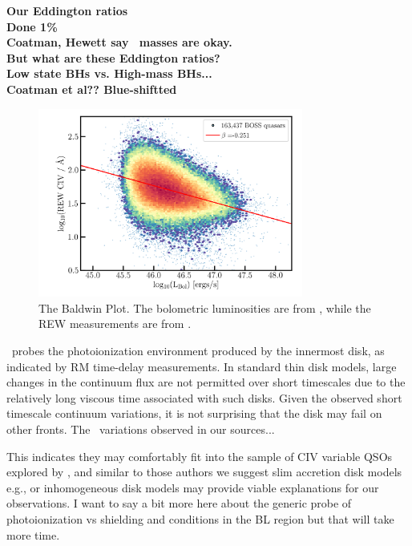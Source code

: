 \documentclass[a4paper,fleqn,usenatbib]{mnras}
\begin{document}
\noindent
{\bf Our Eddington ratios \\
Done 1\% \\
Coatman, Hewett say \civ\ masses are okay.\\
But what are these Eddington ratios? \\
Low state BHs vs. High-mass BHs... \\
Coatman et al?? Blue-shiftted \\
}

\begin{figure}
  \centering
  \includegraphics[width=8.7cm, trim=0.2cm 0.2cm 0.2cm 0.2cm, clip]
  {figures/CIV_CLQs_Baldwin_LBol_20191015.png}
   \vspace{-12pt}
   \caption[]{The Baldwin Plot. The bolometric luminosities are from \citet{Kozlowski2017},
     while the REW measurements are from \citet{Hamann2017}.}
  \label{fig:REWvsFWHM}
\end{figure}

\civ\ probes the photoionization environment produced by the innermost
disk, as indicated by RM time-delay measurements. In standard \citet{SS73}
thin disk models, large changes in the continuum flux are not
permitted over short timescales due to the relatively long viscous
time associated with such disks. Given the observed short timescale
continuum variations, it is not surprising that the \citet{SS73} disk may fail
on other fronts. The \civ\ variations observed in our sources... 

This indicates they may comfortably fit into the sample of CIV
variable QSOs explored by \citet{Dyer2019}, and similar to those
authors we suggest slim accretion disk models e.g., 
\citet[][]{Abramowicz1988} or inhomogeneous disk models
\citep[e.g.,][]{DexterAgol2011} may provide viable explanations for
our observations. I want to say a bit more here about the generic
probe of photoionization vs shielding and conditions in the BL region
but that will take more time.
\end{document}
